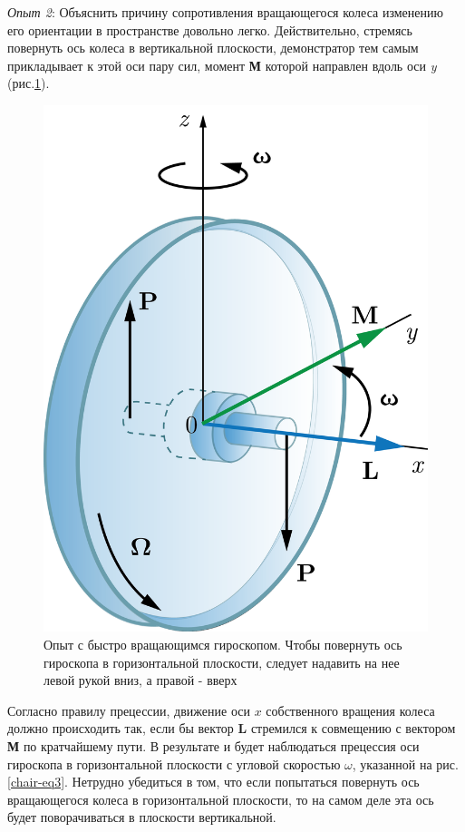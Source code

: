 \documentclass[14pt,a4paper,oneside]{extarticle}	%
\begin{document}
\textit{Опыт 2}:
Объяснить причину сопротивления вращающегося колеса изменению его ориентации в пространстве довольно легко.
Действительно, стремясь повернуть ось колеса в вертикальной плоскости, демонстратор тем самым прикладывает к этой оси пару сил, момент \textbf{М} которой направлен вдоль оси \textit{y} (рис.\ref{chair-3}).
	\begin{figure}[H] 	
	\centering 	
	\includegraphics[width=0.45\linewidth]{chair-3.png}
	\caption{Опыт с быстро вращающимся гироскопом. Чтобы повернуть ось гироскопа в горизонтальной плоскости, следует надавить на нее левой рукой вниз, а правой - вверх}
	\label{chair-3}
\end{figure}

Согласно правилу прецессии, движение оси $x$ собственного вращения колеса должно происходить так, если бы вектор \textbf{L} стремился к совмещению с вектором \textbf{М} по кратчайшему пути.
В результате и будет наблюдаться прецессия оси гироскопа в горизонтальной плоскости с угловой скоростью $ \omega $, указанной на рис.\ref{chair-eq3}.
Нетрудно убедиться в том, что если попытаться повернуть ось вращающегося колеса в горизонтальной плоскости, то на самом деле эта ось будет поворачиваться в плоскости вертикальной.
\newpage
\end{document}
